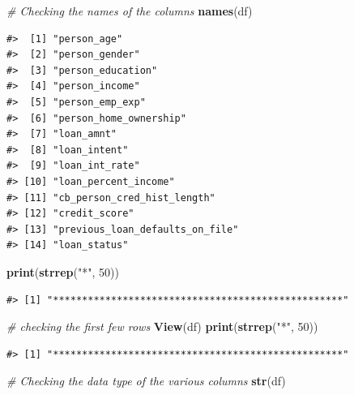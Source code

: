 \documentclass[
  10pt,
]{article}
\newenvironment{Shaded}{\begin{snugshade}}{\end{snugshade}}
\newcommand{\CommentTok}[1]{\textcolor[rgb]{0.56,0.35,0.01}{\textit{#1}}}
\newcommand{\DecValTok}[1]{\textcolor[rgb]{0.00,0.00,0.81}{#1}}
\newcommand{\FunctionTok}[1]{\textcolor[rgb]{0.13,0.29,0.53}{\textbf{#1}}}
\newcommand{\NormalTok}[1]{#1}
\newcommand{\StringTok}[1]{\textcolor[rgb]{0.31,0.60,0.02}{#1}}
\begin{document}
\begin{Shaded}
\begin{Highlighting}[]
\CommentTok{\# Checking the names of the columns}
\FunctionTok{names}\NormalTok{(df)}
\end{Highlighting}
\end{Shaded}

\begin{verbatim}
#>  [1] "person_age"                    
#>  [2] "person_gender"                 
#>  [3] "person_education"              
#>  [4] "person_income"                 
#>  [5] "person_emp_exp"                
#>  [6] "person_home_ownership"         
#>  [7] "loan_amnt"                     
#>  [8] "loan_intent"                   
#>  [9] "loan_int_rate"                 
#> [10] "loan_percent_income"           
#> [11] "cb_person_cred_hist_length"    
#> [12] "credit_score"                  
#> [13] "previous_loan_defaults_on_file"
#> [14] "loan_status"
\end{verbatim}

\begin{Shaded}
\begin{Highlighting}[]
\FunctionTok{print}\NormalTok{(}\FunctionTok{strrep}\NormalTok{(}\StringTok{"*"}\NormalTok{, }\DecValTok{50}\NormalTok{))}
\end{Highlighting}
\end{Shaded}

\begin{verbatim}
#> [1] "**************************************************"
\end{verbatim}

\begin{Shaded}
\begin{Highlighting}[]
\CommentTok{\# checking the first few rows}
\FunctionTok{View}\NormalTok{(df)}
\FunctionTok{print}\NormalTok{(}\FunctionTok{strrep}\NormalTok{(}\StringTok{"*"}\NormalTok{, }\DecValTok{50}\NormalTok{))}
\end{Highlighting}
\end{Shaded}

\begin{verbatim}
#> [1] "**************************************************"
\end{verbatim}

\begin{Shaded}
\begin{Highlighting}[]
\CommentTok{\# Checking the data type of the various columns}
\FunctionTok{str}\NormalTok{(df)}
\end{Highlighting}
\end{Shaded}
\end{document}
